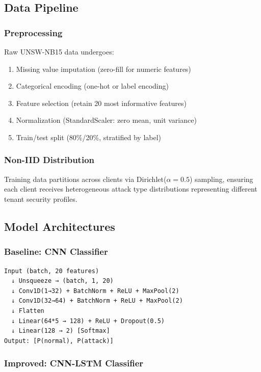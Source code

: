 \subsection{Data Pipeline}

\subsubsection{Preprocessing}

Raw UNSW-NB15 data undergoes:

\begin{enumerate}
    \item Missing value imputation (zero-fill for numeric features)
    \item Categorical encoding (one-hot or label encoding)
    \item Feature selection (retain 20 most informative features)
    \item Normalization (StandardScaler: zero mean, unit variance)
    \item Train/test split (80\%/20\%, stratified by label)
\end{enumerate}

\subsubsection{Non-IID Distribution}

Training data partitions across clients via Dirichlet($\alpha=0.5$) sampling, ensuring each client receives heterogeneous attack type distributions representing different tenant security profiles.

\subsection{Model Architectures}

\subsubsection{Baseline: CNN Classifier}

\begin{verbatim}
Input (batch, 20 features)
  ↓ Unsqueeze → (batch, 1, 20)
  ↓ Conv1D(1→32) + BatchNorm + ReLU + MaxPool(2)
  ↓ Conv1D(32→64) + BatchNorm + ReLU + MaxPool(2)
  ↓ Flatten
  ↓ Linear(64*5 → 128) + ReLU + Dropout(0.5)
  ↓ Linear(128 → 2) [Softmax]
Output: [P(normal), P(attack)]
\end{verbatim}

\subsubsection{Improved: CNN-LSTM Classifier}

